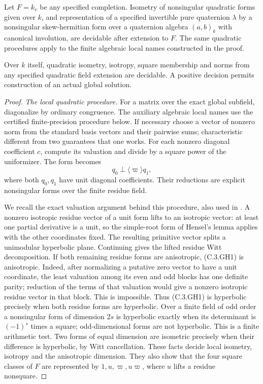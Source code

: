 \begin{lemma}
\label{C:global-function-local-form-algorithms}
Let $F=k_v$ be any specified completion.
Isometry of nonsingular quadratic forms given over $k$,
and representation of a specified invertible pure quaternion
$\lambda$ by a nonsingular skew-hermitian form over a
quaternion algebra $(a,b)_k$ with canonical involution,
are decidable after extension to $F$.
The same quadratic procedures apply to the finite algebraic
local names constructed in the proof.

Over $k$ itself, quadratic isometry, isotropy, square
membership and norms from any specified quadratic field
extension are decidable.  A positive decision permits
construction of an actual global solution.
\end{lemma}
\begin{proof}
\emph{The local quadratic procedure.}
For a matrix over the exact global subfield, diagonalize
by ordinary congruence.  The auxiliary algebraic local
names use the certified finite-precision procedure below.
If necessary choose a vector of nonzero norm
from the standard basis vectors and their pairwise sums;
characteristic different from two guarantees that one
works.  For each nonzero diagonal coefficient $c$,
compute its valuation and divide by a square power of
the uniformizer.  The form becomes
\[
                       q_0\perp\langle\varpi\rangle q_1,
                                                               \tag{C.3.GH1}
\]
where both $q_0,q_1$ have unit diagonal coefficients.
Their reductions are explicit nonsingular forms over
the finite residue field.

We recall the exact valuation argument behind this
procedure, also used in
\cite[Section 2, p.\ 2]{C-DarkeyMensahGlobalForms2021}.
A nonzero isotropic residue vector of a unit form
lifts to an isotropic vector: at least one partial
derivative is a unit, so the simple-root form of
Hensel's lemma applies with the other coordinates fixed.
The resulting primitive vector splits a unimodular
hyperbolic plane.  Continuing gives the lifted residue
Witt decomposition.  If both remaining residue forms
are anisotropic, (C.3.GH1) is anisotropic.
Indeed, after normalizing a putative zero vector to
have a unit coordinate, the least valuation among
its even and odd blocks has one definite parity;
reduction of the terms of that valuation would give
a nonzero isotropic residue vector in that block.
This is impossible.
Thus (C.3.GH1) is hyperbolic precisely when both
residue forms are hyperbolic.
Over a finite field of odd order a nonsingular form
of dimension $2s$ is hyperbolic exactly when its
determinant is $(-1)^s$ times a square; odd-dimensional
forms are not hyperbolic.
This is a finite arithmetic test.
Two forms of equal dimension are isometric precisely
when their difference is hyperbolic, by Witt
cancellation.  These facts decide local isometry,
isotropy and the anisotropic dimension.
They also show that the four square classes of $F$
are represented by $1,u,\varpi,u\varpi$, where
$u$ lifts a residue nonsquare.


\end{proof}
